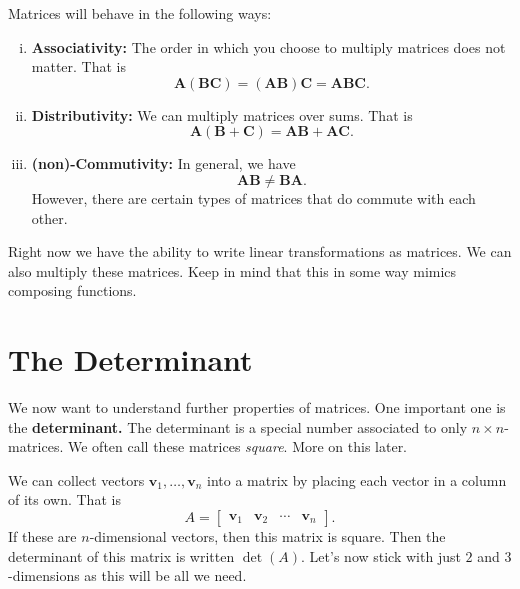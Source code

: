 \begin{enumerate}[(i)]
            Matrices will behave in the following ways:
            \begin{enumerate}[(i)]
                \item \textbf{Associativity:} The order in which you choose to multiply matrices does not matter.  That is 
                \[\mathbf{A}(\mathbf{BC})=(\mathbf{AB})\mathbf{C}=\mathbf{ABC}.\]
                \item \textbf{Distributivity:} We can multiply matrices over sums. That is
                \[
                \mathbf{A}(\mathbf{B}+\mathbf{C})=\mathbf{AB}+\mathbf{AC}.
                \]
                \item \textbf{(non)-Commutivity:} In general, we have
                \[
                \mathbf{AB}\neq \mathbf{BA}.
                \]
                However, there are certain types of matrices that do commute with each other.
            \end{enumerate}
            
            
        \end{enumerate}
        
        Right now we have the ability to write linear transformations as matrices.  We can also multiply these matrices.  Keep in mind that this in some way mimics composing functions.
        
    \section{The Determinant}
        We now want to understand further properties of matrices.  One important one is the \textbf{determinant.} The determinant is a special number associated to only $n\times n$-matrices.  We often call these matrices \emph{square}.  More on this later.  
        
        We can collect vectors $\mathbf{v}_1,\dots,\mathbf{v}_n$ into a matrix by placing each vector in a column of its own.  That is
        \[
        A=\begin{bmatrix}
        \mathbf{v}_1 &\mathbf{v}_2 &\cdots &\mathbf{v}_n
        \end{bmatrix}.
        \]
        If these are $n$-dimensional vectors, then this matrix is square.  Then the determinant of this matrix is written $\det(A)$. Let's now stick with just $2$ and $3$-dimensions as this will be all we need.
        
